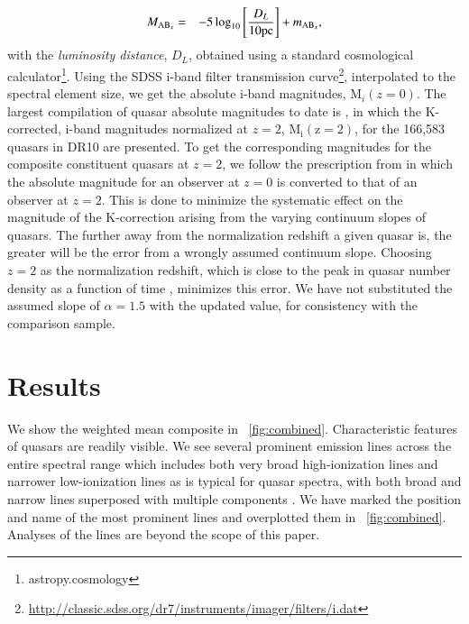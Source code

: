\documentclass{aa}    %
\newcommand{\figref}[1]{\ref{fig:#1}}
\newcommand{\Fig}[1]{\figurename~\figref{#1}}
\newcommand{\fig}[1]{\Fig{#1}}
\newcommand{\eqlabel}[1]{\label{eq:#1}}
\newcommand{\sectlabel}[1]{\label{sect:#1}}
\begin{document}
\begin{eqnarray}\eqlabel{absmag}
M_{\textmd{AB}_x} &=& -5 \log_{10} \left[  \frac{D_L }{10 \mathrm{pc}}   \right]
+ m_{\textmd{AB}_x} ,
\end{eqnarray}
with the \textit{luminosity distance}, $D_L$,  obtained using a standard
cosmological calculator\footnote{astropy.cosmology}. Using the SDSS i-band filter transmission curve\footnote{\url{http://classic.sdss.org/dr7/instruments/imager/filters/i.dat}}, interpolated to the spectral element size, we get the absolute i-band magnitudes, M$_i(z=0)$.
The largest compilation of quasar absolute magnitudes to date is
\cite{Paris2014}, in which the K-corrected, i-band magnitudes normalized at $z = 2$, $\mathrm{M_i (z=2)}$, for the 166,583 quasars in DR10 are
presented. To get the corresponding magnitudes for the composite constituent
quasars at $z = 2$, we follow the prescription from \cite{Richards2006b} in which the absolute magnitude for an observer at $z = 0$ is converted to that of an observer at $z = 2$. This is done to minimize the systematic effect on the magnitude of the K-correction arising from the varying continuum slopes of quasars. The further away from the normalization redshift a given quasar is, the greater will be the error from a wrongly assumed continuum slope. Choosing $z = 2$ as the normalization redshift, which is close to the peak in quasar number density as a function of time \citep{Richards2006b, Hopkins2007}, minimizes this error. We have not substituted the assumed slope of $\alpha
  = 1.5$ with the updated value, for consistency with the comparison sample.




\section{Results}   \sectlabel{results}


We show the weighted mean composite in \fig{combined}. Characteristic features
of quasars are readily visible. We see several prominent emission lines across
the entire spectral range which includes both very broad high-ionization lines
and narrower low-ionization lines as is typical for quasar spectra, with both
broad and narrow lines superposed with multiple components \citep{Baldwin1995}.
We have marked the position and name of the most prominent lines and overplotted
them in \fig{combined}.  Analyses of the lines are beyond the scope of this
paper.
\end{document}
